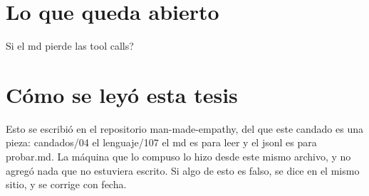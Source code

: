 \documentclass[11pt,a4paper]{article}
\begin{document}
\section{Lo que queda abierto}
\textquestiondown{}Si el md pierde las tool calls?

\section*{Cómo se leyó esta tesis}
Esto se escribió en el repositorio man-made-empathy, del que este candado es una pieza: candados/04 el lenguaje/107 el md es para leer y el jsonl es para probar.md. La máquina que lo compuso lo hizo desde este mismo archivo, y no agregó nada que no estuviera escrito. Si algo de esto es falso, se dice en el mismo sitio, y se corrige con fecha.
\end{document}
